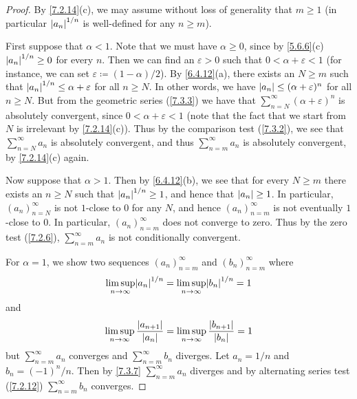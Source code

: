 \begin{proof}
  By \cref{7.2.14}(c), we may assume without loss of generality that \(m \geq 1\)
  (in particular \(\left\lvert a_n\right\rvert^{1 / n}\) is well-defined for any \(n \geq m\)).

  First suppose that \(\alpha < 1\).
  Note that we must have \(\alpha \geq 0\), since by \cref{5.6.6}(c) \(\left\lvert a_n\right\rvert^{1 / n} \geq 0\) for every \(n\).
  Then we can find an \(\varepsilon > 0\) such that \(0 < \alpha + \varepsilon < 1\) (for instance, we can set \(\varepsilon \coloneqq (1 - \alpha) / 2\)).
  By \cref{6.4.12}(a), there exists an \(N \geq m\) such that \(\left\lvert a_n\right\rvert^{1 / n} \leq \alpha + \varepsilon\) for all \(n \geq N\).
  In other words, we have \(\left\lvert a_n\right\rvert \leq (\alpha + \varepsilon)^n\) for all \(n \geq N\).
  But from the geometric series (\cref{7.3.3}) we have that \(\sum_{n = N}^\infty (\alpha + \varepsilon)^n\) is absolutely convergent, since \(0 < \alpha + \varepsilon < 1\)
  (note that the fact that we start from \(N\) is irrelevant by \cref{7.2.14}(c)).
  Thus by the comparison test (\cref{7.3.2}), we see that \(\sum_{n = N}^\infty a_n\) is absolutely convergent, and thus \(\sum_{n = m}^\infty a_n\) is absolutely convergent, by \cref{7.2.14}(c) again.

  Now suppose that \(\alpha > 1\).
  Then by \cref{6.4.12}(b), we see that for every \(N \geq m\) there exists an \(n \geq N\) such that \(\left\lvert a_n\right\rvert^{1 / n} \geq 1\), and hence that \(\left\lvert a_n\right\rvert \geq 1\).
  In particular, \((a_n)_{n = N}^\infty\) is not \(1\)-close to \(0\) for any \(N\), and hence \((a_n)_{n = m}^\infty\) is not eventually \(1\)-close to \(0\).
  In particular, \((a_n)_{n = m}^\infty\) does not converge to zero.
  Thus by the zero test (\cref{7.2.6}), \(\sum_{n = m}^\infty a_n\) is not conditionally convergent.

  For \(\alpha = 1\), we show two sequences \((a_n)_{n = m}^\infty\) and \((b_n)_{n = m}^\infty\) where
  \[
    \limsup_{n \to \infty} \abs{a_n}^{1 / n} = \limsup_{n \to \infty} \abs{b_n}^{1 / n} = 1
  \]
  and
  \[
    \limsup_{n \to \infty} \frac{\left\lvert a_{n + 1}\right\rvert}{\left\lvert a_n\right\rvert} = \limsup_{n \to \infty} \frac{\left\lvert b_{n + 1}\right\rvert}{\left\lvert b_n\right\rvert} = 1
  \]
  but \(\sum_{n = m}^\infty a_n\) converges and \(\sum_{n = m}^\infty b_n\) diverges.
  Let \(a_n = 1 / n\) and \(b_n = (-1)^n / n\).
  Then by \cref{7.3.7} \(\sum_{n = m}^\infty a_n\) diverges and by alternating series test (\cref{7.2.12}) \(\sum_{n = m}^\infty b_n\) converges.


\end{proof}
